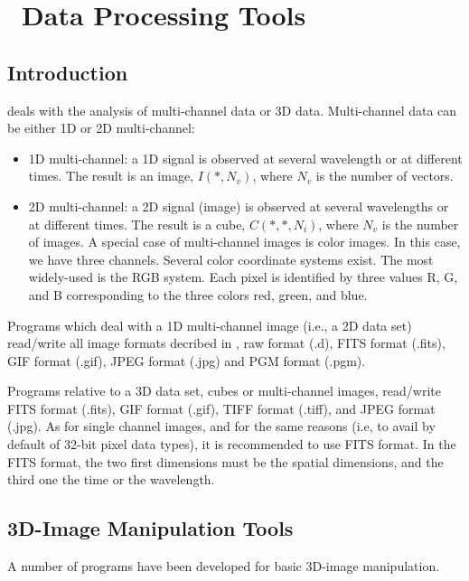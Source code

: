 
\chapter{ \ Data Processing Tools}

\section{Introduction}
 deals with the analysis of multi-channel data or 3D
data. Multi-channel data can be either 1D or 2D multi-channel:
\begin{itemize}
\item 1D multi-channel: a 1D signal is observed at several wavelength
or at different times. The result is an image, $I(*,N_v)$, where
$N_v$ is the number of vectors.
\item 2D multi-channel: a 2D signal (image) is observed at several wavelengths
or at different times. The result is a cube, $C(*,*,N_i)$, where
$N_v$ is the number of images. A special case of multi-channel
images is color images. In this case, we have three channels.
Several color coordinate systems exist.
The most widely-used is the RGB system. Each pixel is identified by
three values R, G, and B corresponding to the three colors red, green, 
and blue.
\end{itemize}

Programs which deal with a 1D multi-channel image (i.e., a 2D data set)
read/write all image formats decribed in \proj, raw format (.d), 
FITS format (.fits), GIF format (.gif), JPEG format (.jpg) 
and PGM format (.pgm). 

Programs relative to a 3D data set, cubes or multi-channel images, 
 read/write FITS format (.fits), GIF format (.gif),
TIFF format (.tiff), and JPEG format (.jpg).
As for single channel images, and for the same reasons (i.e, to avail
by default of 32-bit pixel data types), 
it is recommended to use FITS format. 
In the FITS format, the two first dimensions must be the spatial dimensions,
and the third one the time or the wavelength.

\section{3D-Image Manipulation Tools}
A number of programs have been developed for basic 3D-image manipulation.

